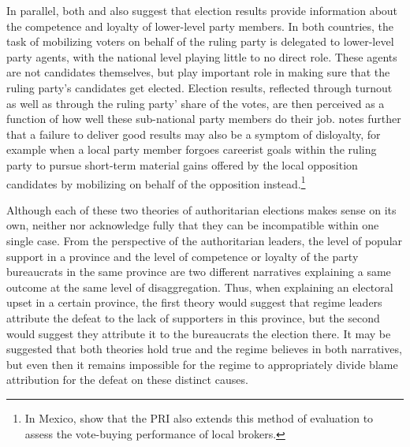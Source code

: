 \documentclass[12pt]{article}\usepackage[]{graphicx}\usepackage[]{color}
\newcommand{\1}{\mathbbm{1}}
\begin{document}
In parallel, both \cite{Magaloni2006} and \cite{Blaydes2008} also suggest that election results provide information about the competence and loyalty of lower-level party members. In both countries, the task of mobilizing voters on behalf of the ruling party is delegated to lower-level party agents, with the national level playing little to no direct role. These agents are not candidates themselves, but play important role in making sure that the ruling party’s candidates get elected. Election results, reflected through turnout as well as through the ruling party' share of the votes, are then perceived as a function of how well these sub-national party members do their job. \cite{Blaydes2008} notes further that a failure to deliver good results may also be a symptom of disloyalty, for example when a local party member forgoes careerist goals within the ruling party to pursue short-term material gains offered by the local opposition candidates by mobilizing on behalf of the opposition instead.\footnote{In Mexico, \cite{Larreguy2016} show that the PRI also extends this method of evaluation to assess the vote-buying performance of local brokers.}

Although each of these two theories of authoritarian elections makes sense on its own, neither \cite{Magaloni2006} nor \cite{Blaydes2008} acknowledge fully that they can be incompatible within one single case. From the perspective of the authoritarian leaders, the level of popular support in a province and the level of competence or loyalty of the party bureaucrats in the same province are two different narratives explaining a same outcome at the same level of disaggregation. Thus, when explaining an electoral upset in a certain province, the first theory would suggest that regime leaders attribute the defeat to the lack of supporters in this province, but the second would suggest they attribute it to the bureaucrats 
the election there. It may be suggested that both theories hold true and the regime believes in both narratives, but even then it remains impossible for the regime to appropriately divide blame attribution for the defeat on these distinct causes.


\end{document}
